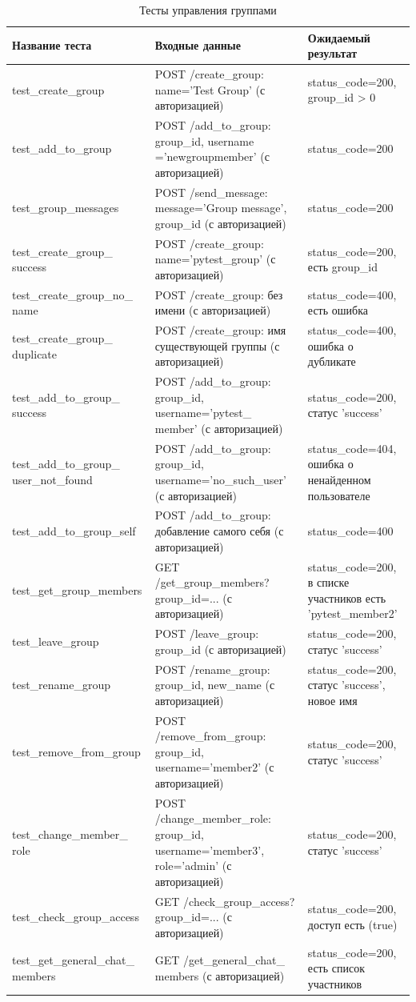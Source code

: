 \begin{xltabular}{\linewidth}{|X|X|X|}
	\caption{Тесты управления группами\label{group-tests}}\\ \hline
	\centrow Название теста & \centrow Входные данные & \centrow Ожидаемый результат \\ \hline
	\endfirsthead
	\finishhead
	test\_create\_group & POST /create\_group: name='Test Group' (с авторизацией) & status\_code=200, group\_id > 0 \\ \hline
	test\_add\_to\_group & POST /add\_to\_group: group\_id, username ='newgroupmember' (с авторизацией) & status\_code=200 \\ \hline
	test\_group\_messages & POST /send\_message: message='Group message', group\_id (с авторизацией) & status\_code=200 \\ \hline
	test\_create\_group\_ success & POST /create\_group: name='pytest\_group' (с авторизацией) & status\_code=200, есть group\_id \\ \hline
	test\_create\_group\_no\_ name & POST /create\_group: без имени (с авторизацией) & status\_code=400, есть ошибка \\ \hline
	test\_create\_group\_ duplicate & POST /create\_group: имя существующей группы (с авторизацией) & status\_code=400, ошибка о дубликате \\ \hline
	test\_add\_to\_group\_ success & POST /add\_to\_group: group\_id, username='pytest\_ member' (с авторизацией) & status\_code=200, статус 'success' \\ \hline
	test\_add\_to\_group\_ user\_not\_found & POST /add\_to\_group: group\_id, username='no\_such\_user' (с авторизацией) & status\_code=404, ошибка о ненайденном пользователе \\ \hline
	test\_add\_to\_group\_self & POST /add\_to\_group: добавление самого себя (с авторизацией) & status\_code=400 \\ \hline
	test\_get\_group\_members & GET /get\_group\_members? group\_id=... (с авторизацией) & status\_code=200, в списке участников есть 'pytest\_member2' \\ \hline
	test\_leave\_group & POST /leave\_group: group\_id (с авторизацией) & status\_code=200, статус 'success' \\ \hline
	test\_rename\_group & POST /rename\_group: group\_id, new\_name (с авторизацией) & status\_code=200, статус 'success', новое имя \\ \hline
	test\_remove\_from\_group & POST /remove\_from\_group: group\_id, username='member2' (с авторизацией) & status\_code=200, статус 'success' \\ \hline
	test\_change\_member\_ role & POST /change\_member\_role: group\_id, username='member3', role='admin' (с авторизацией) & status\_code=200, статус 'success' \\ \hline
	test\_check\_group\_access & GET /check\_group\_access? group\_id=... (с авторизацией) & status\_code=200, доступ есть (true) \\ \hline
	test\_get\_general\_chat\_ members & GET /get\_general\_chat\_ members (с авторизацией) & status\_code=200, есть список участников \\ \hline
\end{xltabular}

